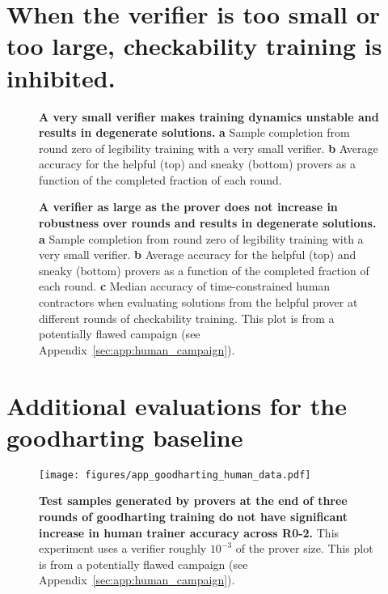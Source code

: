 \documentclass{article}
\begin{document}
\clearpage
\section{When the verifier is too small or too large, checkability training is inhibited.}
\begin{figure}[h]
    \centering
    \caption{\textbf{A very small verifier makes training dynamics unstable and results in degenerate solutions.} \textbf{a} Sample completion from round zero of legibility training with a very small verifier. \textbf{b} Average accuracy for the helpful (top) and sneaky (bottom) provers as a function of the completed fraction of each round.}
    \label{fig:sup_small_verifier}
\end{figure}

\begin{figure}[h]
    \centering
    \caption{\textbf{A verifier as large as the prover does not increase in robustness over rounds and results in degenerate solutions.} \textbf{a} Sample completion from round zero of legibility training with a very small verifier. \textbf{b} Average accuracy for the helpful (top) and sneaky (bottom) provers as a function of the completed fraction of each round. \textbf{c} Median accuracy of time-constrained human contractors when evaluating solutions from the helpful prover at different rounds of checkability training. This plot is from a potentially flawed campaign (see Appendix~\ref{sec:app:human_campaign}).}
\label{fig:sup_large_verifier}
\end{figure}

\clearpage
\section{Additional evaluations for the goodharting baseline}

\begin{figure}[h]
    \centering
    \texttt{[image: figures/app\_goodharting\_human\_data.pdf]}
    \caption{\textbf{Test samples generated by provers at the end of three rounds of goodharting training do not have significant increase in human trainer accuracy across R0-2.} This experiment uses a verifier roughly $10^{-3}$ of the prover size. This plot is from a potentially flawed campaign (see Appendix~\ref{sec:app:human_campaign}).}
    \label{fig:sup:goodhart-human-data}
\end{figure}
\end{document}
